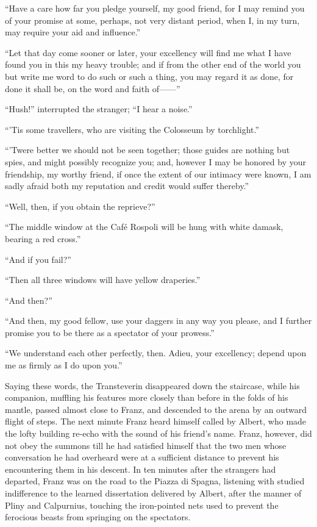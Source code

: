 “Have a care how far you pledge yourself, my good friend, for I may
remind you of your promise at some, perhaps, not very distant period,
when I, in my turn, may require your aid and influence.”

“Let that day come sooner or later, your excellency will find me what I
have found you in this my heavy trouble; and if from the other end of
the world you but write me word to do such or such a thing, you may
regard it as done, for done it shall be, on the word and faith of——”

“Hush!” interrupted the stranger; “I hear a noise.”

“’Tis some travellers, who are visiting the Colosseum by torchlight.”

“’Twere better we should not be seen together; those guides are nothing
but spies, and might possibly recognize you; and, however I may be
honored by your friendship, my worthy friend, if once the extent of our
intimacy were known, I am sadly afraid both my reputation and credit
would suffer thereby.”

“Well, then, if you obtain the reprieve?”

“The middle window at the Café Rospoli will be hung with white damask,
bearing a red cross.”

“And if you fail?”

“Then all three windows will have yellow draperies.”

“And then?”

“And then, my good fellow, use your daggers in any way you please, and
I further promise you to be there as a spectator of your prowess.”

“We understand each other perfectly, then. Adieu, your excellency;
depend upon me as firmly as I do upon you.”

Saying these words, the Transteverin disappeared down the staircase,
while his companion, muffling his features more closely than before in
the folds of his mantle, passed almost close to Franz, and descended to
the arena by an outward flight of steps. The next minute Franz heard
himself called by Albert, who made the lofty building re-echo with the
sound of his friend’s name. Franz, however, did not obey the summons
till he had satisfied himself that the two men whose conversation he
had overheard were at a sufficient distance to prevent his encountering
them in his descent. In ten minutes after the strangers had departed,
Franz was on the road to the Piazza di Spagna, listening with studied
indifference to the learned dissertation delivered by Albert, after the
manner of Pliny and Calpurnius, touching the iron-pointed nets used to
prevent the ferocious beasts from springing on the spectators.

